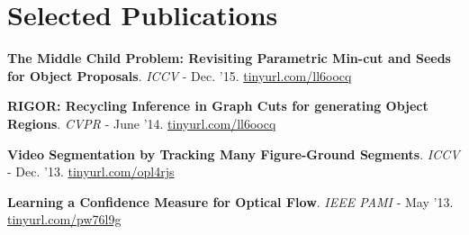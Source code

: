 \documentclass[10pt,twoside,a4paper]{article}
\newif\ifdetail
\begin{document}
\section{\ifdetail \else Selected \fi Publications}
{
\small
\textbf{The Middle Child Problem: Revisiting Parametric Min-cut and Seeds for Object Proposals}. \ifdetail ($1^{\text{st}}$ author) \newline \fi
\textit{\ifdetail International Conference on Computer Vision (ICCV) \else ICCV \fi} - Dec. '15. 
\href{http://ahumayun.com/pubs/humayun_ICCV_2015_poise.pdf}{\ifdetail ahumayun.com/pubs/humayun\_ICCV\_2015\_poise.pdf \else tinyurl.com/ll6oocq \fi} %

\ifdetail
\textbf{Finding Temporally Consistent Occlusion Boundaries in Videos using Geometric Context}. ($2^{\text{nd}}$ author) \newline \textit{IEEE Winter Conference on Applications of Computer Vision (WACV)} - Jan. '15. \href{http://cpl.cc.gatech.edu/projects/temporaloccl/}{cpl.cc.gatech.edu/projects/temporaloccl/} %
\fi

\textbf{RIGOR: Recycling Inference in Graph Cuts for generating Object Regions}. \ifdetail ($1^{\text{st}}$ author) \newline \fi \textit{\ifdetail IEEE Conference on Computer Vision and Pattern Recognition (CVPR) \else CVPR \fi} - June '14. \href{http://cpl.cc.gatech.edu/projects/RIGOR/}{\ifdetail cpl.cc.gatech.edu/projects/RIGOR/ \else tinyurl.com/ll6oocq \fi}

\textbf{Video Segmentation by Tracking Many Figure-Ground Segments}. \ifdetail ($3^{\text{rd}}$ author) \newline \fi \textit{\ifdetail International Conference on Computer Vision (ICCV) \else ICCV \fi} - Dec. '13. \href{http://www.cc.gatech.edu/~fli/SegTrack2/}{\ifdetail cc.gatech.edu/~fli/SegTrack2/ \else tinyurl.com/opl4rjs \fi}

\textbf{Learning a Confidence Measure for Optical Flow}. \ifdetail ($2^{\text{nd}}$ author) \newline \fi \textit{\ifdetail IEEE Transactions on Pattern Analysis and Machine Intelligence (PAMI) \else IEEE PAMI \fi} - May '13. \href{http://visual.cs.ucl.ac.uk/pubs/flowConfidence/}{\ifdetail visual.cs.ucl.ac.uk/pubs/flowConfidence \else tinyurl.com/pw76l9g \fi}

\ifdetail
\textbf{A Novel Paradigm for Mining Cell Phenotypes in Multi-Tag Bioimages \newline using a Locality Preserving Nonlinear Embedding}. ($2^{\text{nd}}$ author) \newline \textit{International Conference on Neural Information Processing (ICONIP)} - Nov. '12. \href{http://ahumayun.com/pubs/khan_ICONIP_2012_cellembedding.pdf}{ahumayun.com/pubs/cellembed12} %
\fi

}
\end{document}

